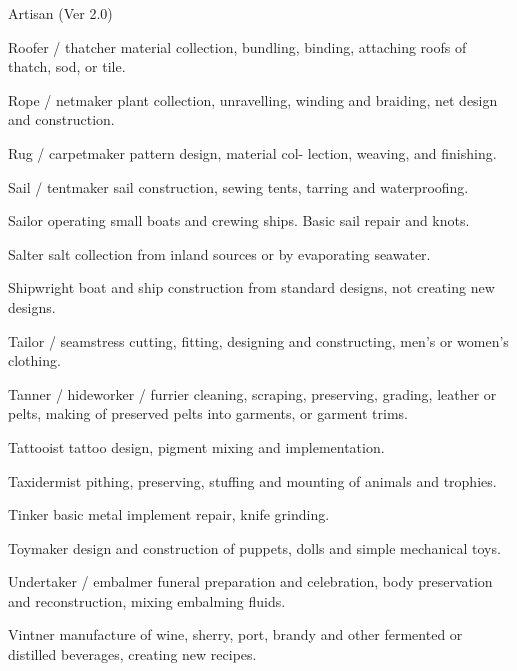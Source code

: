 \begin{Chapter}{Artisan (Ver 2.0)}
\begin{Description}
\item[Roofer / thatcher] material collection, bundling, binding,
  attaching roofs of thatch, sod, or tile.

\item[Rope / netmaker] plant collection, unravelling, winding and
  braiding, net design and construction.

\item[Rug / carpetmaker] pattern design, material col- lection,
  weaving, and finishing.

\item[Sail / tentmaker] sail construction, sewing tents, tarring and
  waterproofing.

\item[Sailor] operating small boats and crewing ships.  Basic sail
  repair and knots.

\item[Salter] salt collection from inland sources or by evaporating
  seawater.

\item[Shipwright] boat and ship construction from standard designs,
  not creating new designs.

\item[Tailor / seamstress] cutting, fitting, designing and
  constructing, men’s or women’s clothing.

\item[Tanner / hideworker / furrier] cleaning, scraping, preserving,
  grading, leather or pelts, making of preserved pelts into garments,
  or garment trims.

\item[Tattooist] tattoo design, pigment mixing and implementation.

\item[Taxidermist] pithing, preserving, stuffing and mounting of
  animals and trophies.

\item[Tinker] basic metal implement repair, knife grinding.

\item[Toymaker] design and construction of puppets, dolls and simple
  mechanical toys.

\item[Undertaker / embalmer] funeral preparation and celebration, body
  preservation and reconstruction, mixing embalming fluids.

\item[Vintner] manufacture of wine, sherry, port, brandy and other
  fermented or distilled beverages, creating new recipes.


\end{Description}
\end{Chapter}

